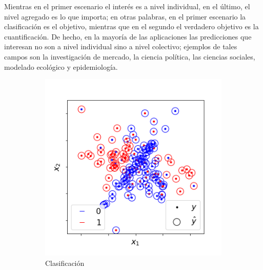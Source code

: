 Mientras en el primer escenario el interés es a nivel individual, en el último,
el nivel agregado es lo que importa; en otras palabras, en el primer escenario
la clasificación es el objetivo, mientras que en el segundo el verdadero
objetivo es la cuantificación. De hecho, en la mayoría de las aplicaciones las
predicciones que interesan no son a nivel individual sino a nivel colectivo;
ejemplos de tales campos son la investigación de mercado, la ciencia política,
las ciencias sociales, modelado ecológico y epidemiología.

\begin{figure}[!h]
    \centering
    \begin{subfigure}[t]{0.45\textwidth}
        \includegraphics[width=\textwidth]{../plots_teoria/intro_scatterplot.png}
        \caption{Clasificación}
    \end{subfigure}
    \hfill
    \begin{subfigure}[t]{0.45\textwidth}

\end{subfigure}
\end{figure}
